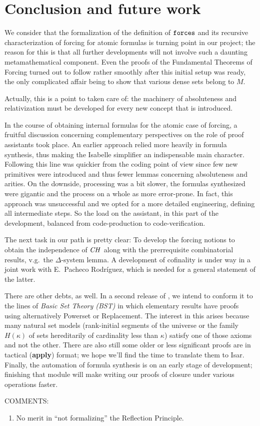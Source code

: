 \section{Conclusion and future work}
\label{sec:conclusion}

We consider that the formalization of the definition of $\mathop{\mathtt{forces}}$
and its recursive characterization of forcing for atomic formulas is
turning point
in our project; the reason for this is that all further
developments will not involve such a daunting metamathematical
component. Even the proofs of the Fundamental Theorems of Forcing
turned out to follow rather smoothly after this initial setup was
ready, the only complicated affair being to show that various dense sets belong
to $M$. 
\begin{framed}
  Actually, this is a point to taken care of: the machinery of
  absoluteness and relativization must be developed for every new
  concept that is introduced.
\end{framed}

In the course of obtaining internal formulas for the atomic case of
forcing, a fruitful discussion
concerning complementary perspectives on the role of proof assistants
took place. An earlier approach relied more heavily in formula
synthesis, thus making the Isabelle simplifier an indispensable main
character. Following this line was quickier from the coding point of
view since few new primitives were introduced and thus fewer lemmas
concerning absoluteness and arities. On the downside, processing was a
bit slower, the formulas synthesized were gigantic and the process on
a whole as more error-prone. In fact, this approach was unsuccessful
and we opted for a more detailed engineering, defining all
intermediate steps. So the load on the assistant, in this part of the
development, balanced from code-production to code-verification. 

The next task in our path is pretty clear: To develop the forcing
notions to obtain the independence of $\mathit{CH}$ 
along with the prerrequisite combinatorial results, v.g.\ the
$\Delta$-system lemma. A development of cofinality is under way in a
joint work with E.~Pacheco Rodríguez, which is needed for a general
statement of the latter. 

There are other debts, as well. In a second
release of , we intend to conform it to the
lines of \emph{Basic Set Theory (BST)} \cite[I.3.1]{kunen2011set} in
which elementary results have proofs using alternatively Powerset or
Replacement. The interest in this arises because many natural set
models
(rank-initial segments of the universe or the family $H(\kappa)$ of
sets hereditarily of cardinality less than $\kappa$) satisfy one of
those axioms and not the other. There are also still some older or
less significant proofs are in tactical (\textbf{apply}) format; we
hope we'll find the time to translate them to Isar. Finally, the
automation of formula synthesis is on an early stage of
development;  finishing that module will make writing our proofs of closure
under various operations faster.
\bigskip
 
COMMENTS:
\begin{enumerate}
\item No merit in ``not formalizing'' the Reflection Principle.
\end{enumerate}

